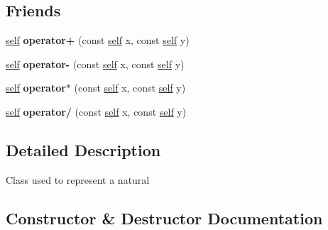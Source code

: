 \subsection*{Friends}
\begin{DoxyCompactItemize}
\item 
\mbox{\label{classez_1_1objects_1_1Natural_ac219ecb06730e7707b9bb78b5da63c3b}} 
\hyperlink{classez_1_1objects_1_1Natural}{self} {\bfseries operator+} (const \hyperlink{classez_1_1objects_1_1Natural}{self} x, const \hyperlink{classez_1_1objects_1_1Natural}{self} y)
\item 
\mbox{\label{classez_1_1objects_1_1Natural_a6750cba02a1d652b1bd892bfba555e50}} 
\hyperlink{classez_1_1objects_1_1Natural}{self} {\bfseries operator-\/} (const \hyperlink{classez_1_1objects_1_1Natural}{self} x, const \hyperlink{classez_1_1objects_1_1Natural}{self} y)
\item 
\mbox{\label{classez_1_1objects_1_1Natural_a4f9af882c7a074ed8e1f8da41bd31dc9}} 
\hyperlink{classez_1_1objects_1_1Natural}{self} {\bfseries operator$\ast$} (const \hyperlink{classez_1_1objects_1_1Natural}{self} x, const \hyperlink{classez_1_1objects_1_1Natural}{self} y)
\item 
\mbox{\label{classez_1_1objects_1_1Natural_aa69c5e8b6898bb99a6f4d6e8962560c8}} 
\hyperlink{classez_1_1objects_1_1Natural}{self} {\bfseries operator/} (const \hyperlink{classez_1_1objects_1_1Natural}{self} x, const \hyperlink{classez_1_1objects_1_1Natural}{self} y)
\end{DoxyCompactItemize}


\subsection{Detailed Description}
Class used to represent a natural 

\subsection{Constructor \& Destructor Documentation}
\mbox{\label{classez_1_1objects_1_1Natural_a58ad55c4f02c9889291cafe5c5b26ec0}} 
